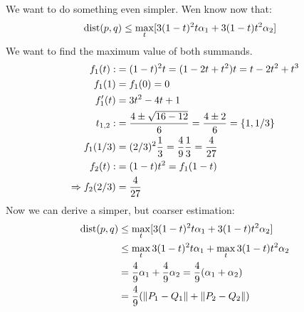 We want to do something even simpler.
Wen know now that:
%
\begin{align*}
\mathrm{dist}(p,q) &\leq \max_t [ 3(1-t)^2 t \alpha_1 + 3 (1-t) t^2 \alpha_2 ]
\end{align*}
%
We want to find the maximum value of both summands.
%
\begin{align*}
f_1(t) :&= (1-t)^2 t = (1-2t+t^2)t = t - 2t^2 + t^3 \\
f_1(1) &= f_1(0) = 0 \\
f_1'(t) &= 3t^2 -4t +1 \\
t_{1,2} :&= \frac{4 \pm \sqrt{16-12}}{6} = \frac {4 \pm 2}6 = \{1, 1/3\} \\
f_1(1/3) &= (2/3)^2 \frac 13 = \frac 49 \frac 13 = \frac{4}{27} \\
f_2(t) :&= (1-t)t^2 = f_1(1-t) \\
\Rightarrow f_2(2/3) &= \frac 4{27}
\end{align*}
%
Now we can derive a simper, but coarser estimation:
%
\begin{align*}
\mathrm{dist}(p,q) &\leq \max_t  [ 3(1-t)^2 t \alpha_1 + 3 (1-t) t^2 \alpha_2 ] \\
&\leq \max_t 3(1-t)^2 t \alpha_1 + \max_t 3 (1-t) t^2 \alpha_2 \\
&= \frac 49 \alpha_1 + \frac 49 \alpha_2 = \frac 49 (\alpha_1 + \alpha_2) \\
&= \frac 49 (\|P_1-Q_1\| + \|P_2-Q_2\|)
\end{align*}


